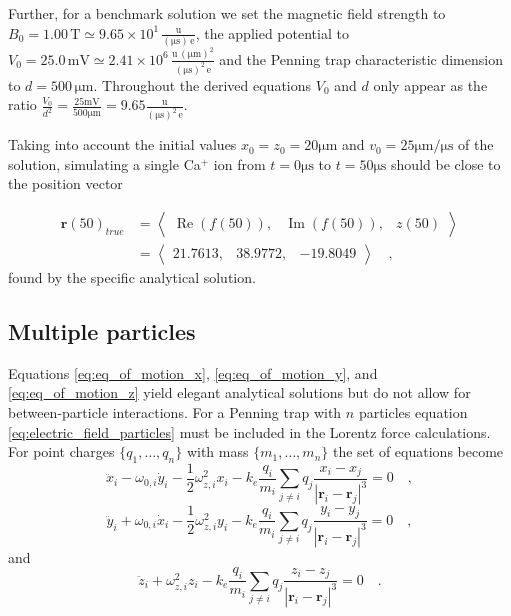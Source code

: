 \documentclass[../main_proj3.tex]{subfiles}
\begin{document}
Further, for a benchmark solution we set the magnetic field strength to $B_0 = 1.00\,\mathrm{T} \simeq 9.65 \times 10^1 \, \frac{\mathrm{u}}{(\mathrm{\mu s}) \, \mathrm{e}}$, the applied potential to $V_0 = 25.0\,\mathrm{mV} \simeq 2.41 \times 10^6 \, \frac{\mathrm{u} \, (\mathrm{\mu m})^2}{(\mathrm{\mu s})^2 \, \mathrm{e}}$ and the Penning trap characteristic dimension to $d = 500\,\mathrm{\mu m}$. Throughout the derived equations $V_0$ and $d$ only appear as the ratio $\frac{V_0}{d^{2}} = \frac{25 \mathrm{mV}}{500 \mathrm{\mu m}} = 9.65  \frac{\mathrm{u}}{(\mathrm{\mu s})^2 \, \mathrm{e}}$.


Taking into account the initial values $x_0 = z_0 = 20 \mathrm{\mu m}$ and $v_0 = 25 \mathrm{\mu m / \mu s}$ of the solution, simulating a single Ca$^{+}$ ion from $t=0\mathrm{\mu s}$ to $t= 50 \mathrm{\mu s}$ should be close to the position vector

\begin{equation*}
\begin{split}
\mathbf{r}(50)_{true} &= 
\left\langle
\begin{matrix}
\operatorname{Re}(f(50)), &\operatorname{Im}(f(50)),& z(50) 
\end{matrix} \right\rangle\\
&= \left\langle
\begin{matrix} 
21.7613,& 38.9772,& -19.8049 
\end{matrix}
\right \rangle \quad,
\end{split}
\end{equation*}
found by the specific analytical solution. 

\subsection{Multiple particles} 

Equations \eqref{eq:eq_of_motion_x}, \eqref{eq:eq_of_motion_y}, and \eqref{eq:eq_of_motion_z} yield elegant analytical solutions but do not allow for between-particle interactions. For a Penning trap with $n$ particles equation \eqref{eq:electric_field_particles} must be included in the Lorentz force calculations. For point charges $\{q_1, \dots, q_n\}$ with mass $\{m_1, \dots, m_n\}$ the set of equations become 
\begin{equation}
\label{eq:eq_of_motion_x_with_particleinteractions}
\ddot{x}_i - \omega_{0,i}\dot{y}_i - \frac{1}{2} \omega_{z,i}^2 x_i - k_e \frac{q_i}{m_i}\sum_{j\neq i}q_j \frac{x_i-x_j}{|\mathbf{r}_i - \mathbf{r}_j|^3} = 0 
\quad ,
\end{equation}
\begin{equation}
\label{eq:eq_of_motion_y_with_particleinteractions}
\ddot{y}_i + \omega_{0,i}\dot{x}_i - \frac{1}{2} \omega_{z,i}^2 y_i - k_e \frac{q_i}{m_i}\sum_{j\neq i}q_j \frac{y_i-y_j}{|\mathbf{r}_i - \mathbf{r}_j|^3} = 0
\quad ,
\end{equation}
and 
\begin{equation}
\label{eq:eq_of_motion_z_with_particleinteractions}
\ddot{z}_i + \omega_{z,i}^2z_i - k_e \frac{q_i}{m_i} \sum_{j\neq i}q_j \frac{z_i-z_j}{|\mathbf{r}_i - \mathbf{r}_j|^3} = 0 \quad. 
\end{equation}
\end{document}
